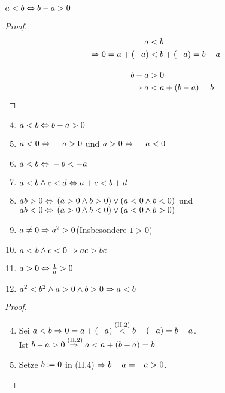\begin{beispiel}
    $a<b\equivalent b - a > 0$
    \begin{proof}
        \begin{align*}
            a &<b\\
            \impl 0 = a + \pair{-a} &< b + \pair{-a} = b - a\\[10pt]
            b-a &>0\\
            \impl a &< a + \pair{b-a} = b\qedhere
        \end{align*}
    \end{proof}
\end{beispiel}


\begin{satz}
    \marginnote{[7. Nov]}
    \theoremescape
    \begin{enumerate}[label=(II.\arabic*)]
        \setcounter{enumi}{3}
        \item $a<b\equivalent b-a > 0$
        \item $a<0\equivalent -a > 0$ und $a>0\equivalent -a < 0$
        \item $a<b\equivalent -b < -a$
        \item $a<b \land c < d \equivalent a+c<b+d$
        \item $ab > 0 \equivalent \pair{a>0 \land b > 0}\lor\pair{a < 0 \land b < 0}$ und $ab < 0 \equivalent \pair{a>0 \land b < 0}\lor\pair{a < 0 \land b > 0}$
        \item $a\neq 0 \impl a^2 > 0$\quad(Insbesondere $1>0$)
        \item $a<b \land c<0 \impl ac > bc$
        \item $a>0 \equivalent \frac{1}{a}>0$
        \item $a^2 < b^2 \land a > 0 \land b > 0 \impl a < b$
    \end{enumerate}
    \newpage
    \begin{proof}
        \theoremescape
        \begin{enumerate}[label=(II.\arabic*)]
            \setcounter{enumi}{3}
            \item Sei $a<b \impl 0=a+(-a) \annot{<}{(II.2)} b + (-a) = b-a$.\\
            Ist $b-a>0 \annot{\impl}{(II.2)} a<a+(b-a)=b$
            \item Setze $b\definedas 0$ in (II.4) $\impl b-a=-a>0$.\\

\end{enumerate}
\end{proof}
\end{satz}
